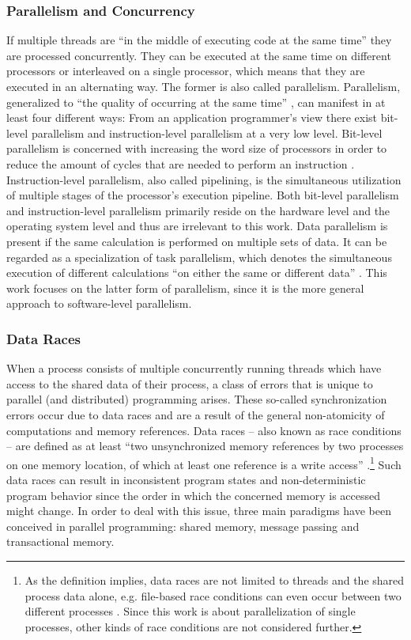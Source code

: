 \subsubsection{Parallelism and Concurrency}
If multiple threads are ``in the middle of executing code at the same time'' \cite[p.~124(?)]{MultiProgWithJavaTech} they are processed concurrently. They can be executed at the same time on different processors or interleaved on a single processor, which means that they are executed in an alternating way. The former is also called parallelism. Parallelism, generalized to ``the quality of occurring at the same time'' \cite[p.~91]{OSs_AConceptBasedApproach}, can manifest in at least four different ways: From an application programmer's view there exist bit-level parallelism and instruction-level parallelism at a very low level. Bit-level parallelism is concerned with increasing the word size of processors in order to reduce the amount of cycles that are needed to perform an instruction \cite[p.~15]{ParCompArchitecture_HW/SW_Approach}. Instruction-level parallelism, also called pipelining, is the simultaneous utilization of multiple stages of the processor's execution pipeline. Both bit-level parallelism and instruction-level parallelism primarily reside on the hardware level and the operating system level and thus are irrelevant to this work. Data parallelism is present if the same calculation is performed on multiple sets of data. It can be regarded as a specialization of task parallelism, which denotes the simultaneous execution of different calculations ``on either the same or different data'' \cite[p.~125]{ParCompArchitecture_HW/SW_Approach}. This work focuses on the latter form of parallelism, since it is the more general approach to software-level parallelism.

\subsubsection{Data Races}
When a process consists of multiple concurrently running threads which have access to the shared data of their process, a class of errors that is unique to parallel (and distributed) programming arises. These so-called synchronization errors occur due to data races and are a result of the general non-atomicity of computations and memory references. Data races -- also known as race conditions -- are defined as at least ``two unsynchronized memory references by two processes on one memory location, of which at least one reference is a write access'' \cite[p.~327]{ParallelComputing}.\footnote{As the definition implies, data races are not limited to threads and the shared process data alone, e.g. file-based race conditions can even occur between two different processes \cite{OfficialISC2Guide}. Since this work is about parallelization of single processes, other kinds of race conditions are not considered further.} Such data races can result in inconsistent program states and non-deterministic program behavior since the order in which the concerned memory is accessed might change. In order to deal with this issue, three main paradigms have been conceived in parallel programming: shared memory, message passing and transactional memory.

